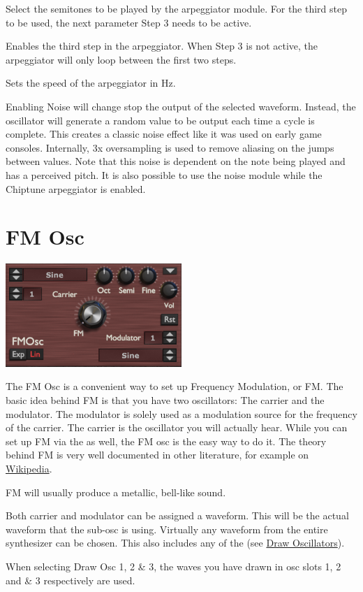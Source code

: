 {Select the semitones to be played by the arpeggiator module. For the third step to be used, the next parameter Step 3 needs to be active.}

{Enables the third step in the arpeggiator. When Step 3 is not active, the arpeggiator will only loop between the first two steps.}

{Sets the speed of the arpeggiator in Hz.}

{Enabling Noise will change stop the output of the selected waveform. Instead, the oscillator will generate a random value to be output each time a cycle is complete. This creates a classic noise effect like it was used on early game consoles. Internally, 3x oversampling is used to remove aliasing on the jumps between values. Note that this noise is dependent on the note being played and has a perceived pitch. It is also possible to use the noise module while the Chiptune arpeggiator is enabled.}

\section{FM Osc}
\label{fm_osc}
\begin{center}
    \includegraphics[width=0.5\textwidth]{graphics/fm_osc.png}
\end{center}
The FM Osc is a convenient way to set up Frequency Modulation, or FM. The basic idea behind FM is that you have two oscillators: The carrier and the modulator. The modulator is solely used as a modulation source for the frequency of the carrier. The carrier is the oscillator you will actually hear. While you can set up FM via the \modmatrix as well, the FM osc is the easy way to do it. The theory behind FM is very well documented in other literature, for example on \hyperlink{https://de.wikipedia.org/wiki/FM-Synthese}{Wikipedia}.

FM will usually produce a metallic, bell-like sound.

{Both carrier and modulator can be assigned a waveform. This will be the actual waveform that the sub-osc is using. Virtually any waveform from the entire synthesizer can be chosen. This also includes any of the (see \hyperref[wavedraw]{Draw Oscillators}).

When selecting  Draw Osc 1, 2 \& 3, the waves you have drawn in osc slots 1, 2 and \& 3 respectively are used.}

